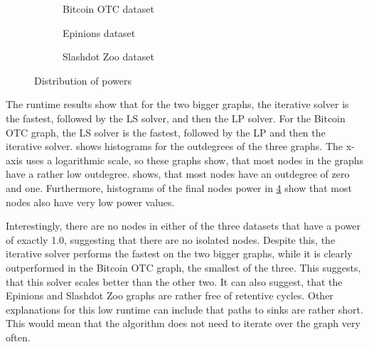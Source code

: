 \begin{figure}[t]
    \centering
        \begin{subfigure}[t]{0.30\textwidth}
        \caption{Bitcoin OTC dataset}
        \label{subfig:bitcoinotc_powers}
    \end{subfigure}
    \hfill
        \begin{subfigure}[t]{0.30\textwidth}
        \caption{Epinions dataset}
        \label{subfig:epinions_powers}
    \end{subfigure}
    \hfill
    \begin{subfigure}[t]{0.30\textwidth}
    	\centering
    	\caption{Slashdot Zoo dataset}
	\label{subfig:slashdot_powers}
    \end{subfigure}
    \caption{Distribution of powers}
    \label{fig:datasets_powers}
\end{figure}



The runtime results show that for the two bigger graphs, the iterative solver is the fastest, followed by the LS solver, and then the LP solver. For the Bitcoin OTC graph, the LS solver is the fastest, followed by the LP and then the iterative solver.  shows histograms for the outdegrees of the three graphs. The x-axis uses a logarithmic scale, so these graphs show, that most nodes in the graphs have a rather low outdegree.  shows, that most nodes have an outdegree of zero and one. Furthermore, histograms of the final nodes power in \cref{fig:datasets_powers} show that most nodes also have very low power values. 

Interestingly, there are no nodes in either of the three datasets that have a power of exactly 1.0, suggesting that there are no isolated nodes. Despite this, the iterative solver performs the fastest on the two bigger graphs, while it is clearly outperformed in the Bitcoin OTC graph, the smallest of the three. This suggests, that this solver scales better than the other two. It can also suggest, that the Epinions and Slashdot Zoo graphs are rather free of retentive cycles. Other explanations for this low runtime can include that paths to sinks are rather short. This would mean that the algorithm does not need to iterate over the graph very often.  

